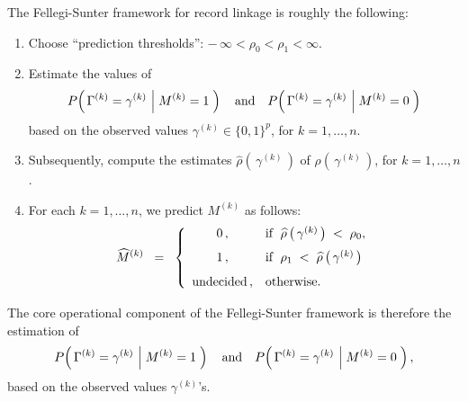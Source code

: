 \begin{remark}
The Fellegi-Sunter framework for record linkage is roughly the following:
\begin{enumerate}
\item
	Choose ``prediction thresholds'': \;$-\,\infty < \rho_{0} < \rho_{1} < \infty$.
\item
	{\color{red}Estimate} the values of
	\begin{equation*}
	P\!\left(\,
		\Gamma^{(k)}=\gamma^{(k)}\,
		\left\vert\;M^{(k)} = \overset{{\color{white}.}}{1}\right.
		\,\right)
	\quad\textnormal{and}\quad
	P\!\left(\,
		\Gamma^{(k)}=\gamma^{(k)}\,
		\left\vert\;M^{(k)} = \overset{{\color{white}.}}{0}\right.
		\,\right)
	\end{equation*}
	based on the observed values $\gamma^{(k)} \in \{0,1\}^{p}$, for $k = 1,\ldots,n$.
\item
	Subsequently, compute the estimates $\widehat{\rho}\left(\,\gamma^{(k)}\,\right)$
	of $\rho\!\left(\,\gamma^{(k)}\,\right)$, for $k = 1,\ldots,n$.
\item
	For each $k = 1,\ldots, n$, we predict $M^{(k)}$ as follows:
	\begin{equation*}
	\widehat{M}^{(k)}
	\;\;=\;\;
	\left\{\begin{array}{cl}
	0\,, & \textnormal{if \;$\widehat{\rho}\left(\,\gamma^{(k)}\,\right) \;<\; \rho_{0}$},
	\\
	\overset{{\color{white}|}}{1}\,, & \textnormal{if \;$\rho_{1} \;<\; \widehat{\rho}\left(\,\gamma^{(k)}\,\right)$}
	\\
	\overset{{\color{white}|}}{\textnormal{undecided}}\,, & \textnormal{otherwise.}
	\end{array}\right.
	\end{equation*}
\end{enumerate}
The core operational component of the Fellegi-Sunter framework is therefore the estimation of
	\begin{equation*}
	P\!\left(\,
		\Gamma^{(k)}=\gamma^{(k)}\,
		\left\vert\;M^{(k)} = \overset{{\color{white}.}}{1}\right.
		\,\right)
	\quad\textnormal{and}\quad
	P\!\left(\,
		\Gamma^{(k)}=\gamma^{(k)}\,
		\left\vert\;M^{(k)} = \overset{{\color{white}.}}{0}\right.
		\,\right),
	\end{equation*}
based on the observed values $\gamma^{(k)}$'s.
\end{remark}

